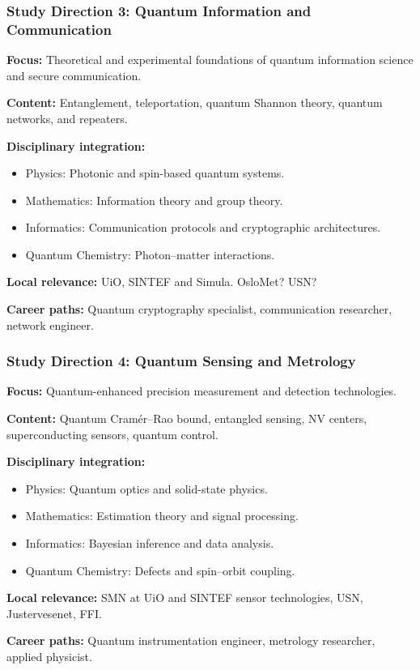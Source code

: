 \documentclass{beamer}
\begin{document}
\begin{frame}
\frametitle{Study Direction 3: Quantum Information and Communication}
\textbf{Focus:} Theoretical and experimental foundations of quantum information science and secure communication.

\textbf{Content:} Entanglement, teleportation, quantum Shannon theory, quantum networks, and repeaters.

\textbf{Disciplinary integration:}
\begin{itemize}
    \item Physics: Photonic and spin-based quantum systems.
    \item Mathematics: Information theory and group theory.
    \item Informatics: Communication protocols and cryptographic architectures.
    \item Quantum Chemistry: Photon–matter interactions.
\end{itemize}

\textbf{Local relevance:} UiO, SINTEF and  Simula. OsloMet? USN?

\textbf{Career paths:} Quantum cryptography specialist, communication researcher, network engineer.

\end{frame}


\begin{frame}
\frametitle{Study Direction 4: Quantum Sensing and Metrology}
\textbf{Focus:} Quantum-enhanced precision measurement and detection technologies.

\textbf{Content:} Quantum Cramér–Rao bound, entangled sensing, NV centers, superconducting sensors, quantum control.

\textbf{Disciplinary integration:}
\begin{itemize}
    \item Physics: Quantum optics and solid-state physics.
    \item Mathematics: Estimation theory and signal processing.
    \item Informatics: Bayesian inference and data analysis.
    \item Quantum Chemistry: Defects and spin–orbit coupling.
\end{itemize}

\textbf{Local relevance:} SMN  at UiO and SINTEF sensor technologies, USN, Justervesenet, FFI.

\textbf{Career paths:} Quantum instrumentation engineer, metrology researcher, applied physicist.

\end{frame}
\end{document}
